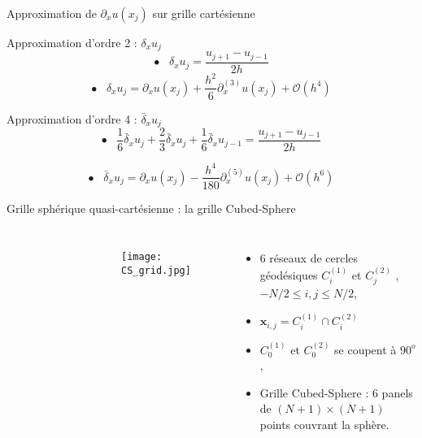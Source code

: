 \documentclass[11pt]{beamer}
\begin{document}
\begin{frame}{Approximation de $\partial_x u(x_j)$ sur grille cartésienne}
\begin{block}{Approximation d'ordre 2 : $\delta_x u_j$}
\begin{equation*}
\bullet \;\;\; \delta_x u_j = \dfrac{u_{j+1}- u_{j-1}}{2h}
\end{equation*}
\begin{equation*}
\bullet \;\;\; \delta_x u_j = \partial_x u(x_j) + \dfrac{h^2}{6} \partial^{(3)}_x u(x_j) + \mathcal{O}\left( h^4 \right)
\end{equation*}
\end{block}

\begin{block}{Approximation d'ordre 4 : $\bar{\delta}_x u_j$}
\begin{equation*}
\bullet \;\;\; \dfrac{1}{6}\bar{\delta}_x u_j+\dfrac{2}{3}\bar{\delta}_x u_j + \dfrac{1}{6}\bar{\delta}_x u_{j-1} = \dfrac{u_{j+1}- u_{j-1}}{2h}
\end{equation*}

\begin{equation*}
\bullet \;\;\; \bar{\delta}_x u_j = \partial_x u(x_j) - \dfrac{h^4}{180} \partial^{(5)}_x u (x_j) + \mathcal{O}\left( h^6 \right)
\end{equation*}
\end{block}
\end{frame}


\begin{frame}{Grille sphérique quasi-cartésienne : la grille Cubed-Sphere}
\begin{columns}
\tiny
\begin{figure}
\def\svgwidth{0.55 \textwidth}
\vspace{0.5cm}

\end{figure}
\begin{figure}
\begin{center}
\texttt{[image: CS\_grid.jpg]}
\end{center}
\end{figure}

\begin{itemize}
\item 6 réseaux de cercles géodésiques $C_i^{(1)}$ et $C_j^{(2)}$ , $-N/2 \leq i,j \leq N/2$,

\item $\mathbf{x}_{i,j}=C_i^{(1)} \cap C_i^{(2)}$

\item $C_0^{(1)}$ et $C_0^{(2)}$ se coupent à $90^o$,

\item Grille Cubed-Sphere : 6 panels de $(N+1) \times (N+1)$ points couvrant la sphère.
\end{itemize}
\end{columns}
\end{frame}
\end{document}
